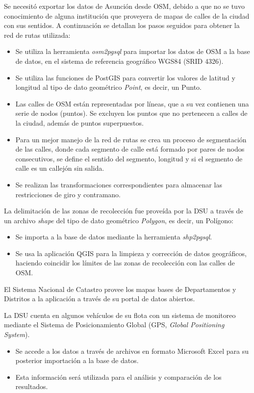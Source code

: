 Se necesitó exportar los datos de Asunción desde OSM, debido a que no se tuvo conocimiento de alguna institución que proveyera de mapas de calles de la ciudad con sus sentidos. A continuación se detallan los pasos seguidos para obtener la red de rutas utilizada: 
\begin{itemize}
\item Se utiliza la herramienta \textit{osm2pgsql} para importar los datos de OSM a la base de datos, en el sistema de referencia geográfico WGS84 (SRID 4326). 
\item Se utiliza las funciones de PostGIS para convertir los valores de latitud y longitud al tipo de dato geométrico \textit{Point}, es decir, un Punto. 
\item Las calles de OSM están representadas por líneas, que a su vez contienen una serie de nodos (puntos). Se excluyen los puntos que no pertenecen a calles de la ciudad, además de puntos superpuestos. 
\item Para un mejor manejo de la red de rutas se crea un proceso de segmentación de las calles, donde cada segmento de calle está formado por pares de nodos consecutivos, se define el sentido del segmento, longitud y si el segmento de calle es un callejón sin salida. 
\item Se realizan las transformaciones correspondientes para almacenar las restricciones de giro y contramano.
\end{itemize}

La delimitación de las zonas de recolección fue proveída por la DSU a través de un archivo \textit{shape} del tipo de dato geométrico \textit{Polygon}, es decir, un Polígono:
\begin{itemize}
\item Se importa a la base de datos mediante la herramienta \textit{shp2pgsql}.
\item Se usa la aplicación QGIS para la limpieza y corrección de datos geográficos, haciendo coincidir los límites de las zonas de recolección con las calles de OSM.
\end{itemize}

El Sistema Nacional de Catastro provee los mapas bases de Departamentos y Distritos a la aplicación a través de su portal de datos abiertos. 

La DSU cuenta en algunos vehículos de su flota con un sistema de monitoreo mediante el Sistema de Posicionamiento Global (GPS, \textit{Global Positioning System}). 

\begin{itemize}
    \item Se accede a los datos a través de archivos en formato Microsoft Excel para su posterior importación a la base de datos. 
    \item Esta información será utilizada para el análisis y comparación de los resultados.
\end{itemize}

